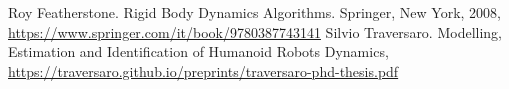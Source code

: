 {}
\begin{thebibliography}{99}
	Roy Featherstone. Rigid Body Dynamics Algorithms.  Springer, New York, 2008, \url{https://www.springer.com/it/book/9780387743141}
	Silvio Traversaro. Modelling, Estimation and Identification of Humanoid Robots Dynamics, \url{https://traversaro.github.io/preprints/traversaro-phd-thesis.pdf}
	
\end{thebibliography}